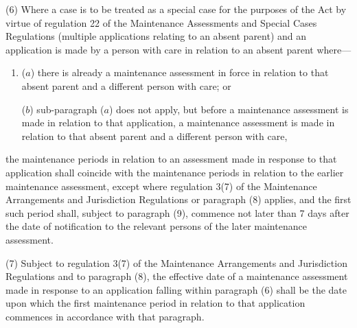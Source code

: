 \documentclass[a4paper]{article}
\begin{document}

(6) Where a case is to be treated as a special case for the purposes of the Act by virtue of regulation 22 of the Maintenance Assessments and Special Cases Regulations (multiple applications relating to an absent parent) and an application is made by a person with care in relation to an absent parent where—
\begin{enumerate}\item[]
($a$) there is already a maintenance assessment in force in relation to that absent parent and a different person with care; or

($b$) sub-paragraph ($a$) does not apply, but before a maintenance assessment is made in relation to that application, a maintenance assessment is made in relation to that absent parent and a different person with care,
\end{enumerate}
the maintenance periods in relation to an assessment made in response to that application shall coincide with the maintenance periods in relation to the earlier maintenance assessment, except where regulation 3(7) of the Maintenance Arrangements and Jurisdiction Regulations or paragraph (8) applies, and the first such period shall, subject to paragraph (9), commence not later than 7 days after the date of notification to the relevant persons of the later maintenance assessment.

(7) Subject to regulation 3(7) of the Maintenance Arrangements and Jurisdiction Regulations and to paragraph (8), the effective date of a maintenance assessment made in response to an application falling within paragraph (6) shall be the date upon which the first maintenance period in relation to that application commences in accordance with that paragraph.
\end{document}
